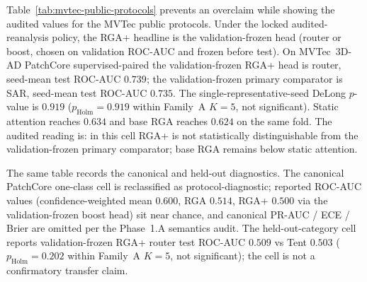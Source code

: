 \documentclass[10pt,conference]{IEEEtran}
\newcommand{\method}{RGA}
\newcommand{\methodplus}{RGA+}
\begin{document}

Table~\ref{tab:mvtec-public-protocols} prevents an overclaim while
showing the audited values for the MVTec public protocols. Under the
locked audited-reanalysis policy, the \methodplus{} headline is the
validation-frozen head (router or boost, chosen on validation
ROC-AUC and frozen before test). On MVTec~3D-AD PatchCore
supervised-paired the validation-frozen \methodplus{} head is router,
seed-mean test ROC-AUC $0.739$; the validation-frozen primary
comparator is SAR, seed-mean test ROC-AUC $0.735$. The
single-representative-seed DeLong $p$-value is $0.919$
($p_{\mathrm{Holm}}=0.919$ within Family~A $K{=}5$, not significant).
Static attention reaches $0.634$ and base \method{} reaches $0.624$
on the same fold. The audited reading is: in this cell \methodplus{}
is not statistically distinguishable from the validation-frozen
primary comparator; base \method{} remains below static attention.

The same table records the canonical and held-out diagnostics.
The canonical PatchCore one-class cell is reclassified as
protocol-diagnostic; reported ROC-AUC values
(confidence-weighted mean $0.600$, \method{} $0.514$,
\methodplus{} $0.500$ via the validation-frozen boost head) sit
near chance, and canonical PR-AUC / ECE / Brier are omitted per the
Phase~1.A semantics audit. The held-out-category cell reports
validation-frozen \methodplus{} router test ROC-AUC $0.509$ vs
Tent $0.503$ ($p_{\mathrm{Holm}}=0.202$ within Family~A $K{=}5$,
not significant); the cell is not a confirmatory transfer claim.
\end{document}
